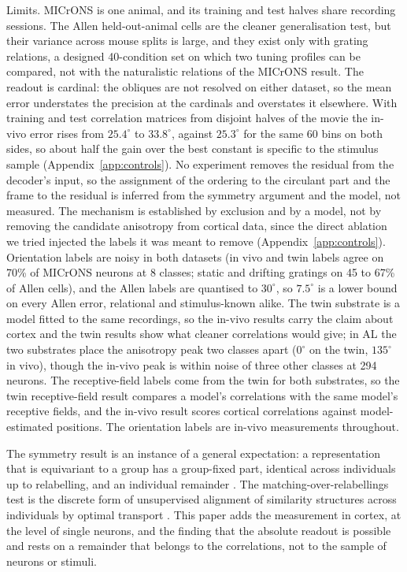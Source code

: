 \documentclass[11pt]{article}
\begin{document}
Limits. MICrONS is one animal, and its training and test halves share recording sessions. The Allen held-out-animal cells are the cleaner generalisation test, but their variance across mouse splits is large, and they exist only with grating relations, a designed 40-condition set on which two tuning profiles can be compared, not with the naturalistic relations of the MICrONS result. The readout is cardinal: the obliques are not resolved on either dataset, so the mean error understates the precision at the cardinals and overstates it elsewhere. With training and test correlation matrices from disjoint halves of the movie the in-vivo error rises from $25.4^\circ$ to $33.8^\circ$, against $25.3^\circ$ for the same 60 bins on both sides, so about half the gain over the best constant is specific to the stimulus sample (Appendix~\ref{app:controls}). No experiment removes the residual from the decoder's input, so the assignment of the ordering to the circulant part and the frame to the residual is inferred from the symmetry argument and the model, not measured. The mechanism is established by exclusion and by a model, not by removing the candidate anisotropy from cortical data, since the direct ablation we tried injected the labels it was meant to remove (Appendix~\ref{app:controls}). Orientation labels are noisy in both datasets (in vivo and twin labels agree on 70\% of MICrONS neurons at 8 classes; static and drifting gratings on 45 to 67\% of Allen cells), and the Allen labels are quantised to $30^\circ$, so $7.5^\circ$ is a lower bound on every Allen error, relational and stimulus-known alike. The twin substrate is a model fitted to the same recordings, so the in-vivo results carry the claim about cortex and the twin results show what cleaner correlations would give; in AL the two substrates place the anisotropy peak two classes apart ($0^\circ$ on the twin, $135^\circ$ in vivo), though the in-vivo peak is within noise of three other classes at 294 neurons. The receptive-field labels come from the twin for both substrates, so the twin receptive-field result compares a model's correlations with the same model's receptive fields, and the in-vivo result scores cortical correlations against model-estimated positions. The orientation labels are in-vivo measurements throughout.

The symmetry result is an instance of a general expectation: a representation that is equivariant to a group has a group-fixed part, identical across individuals up to relabelling, and an individual remainder \citep{oizumi2026}. The matching-over-relabellings test is the discrete form of unsupervised alignment of similarity structures across individuals by optimal transport \citep{kawakita2025}. This paper adds the measurement in cortex, at the level of single neurons, and the finding that the absolute readout is possible and rests on a remainder that belongs to the correlations, not to the sample of neurons or stimuli.
\end{document}
